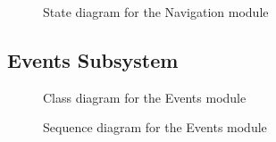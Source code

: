 \documentclass{article}
\begin{document}
			\begin{figure}[H]
				
				\caption{State diagram for the Navigation module}
				
			\end{figure}
		
		
		\pagebreak
		
		\subsection{Events Subsystem}
		
			\begin{figure}[H]
				
				\caption{Class diagram for the Events module}
				
			\end{figure}
		
			\begin{figure}[H]
				
				\caption{Sequence diagram for the Events module}
				
			\end{figure}
		
\end{document}
